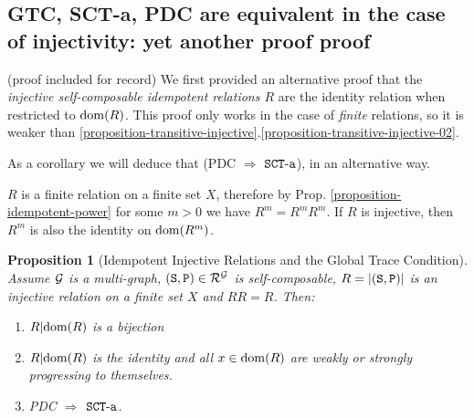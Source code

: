 \documentclass{lmcs}
\newtheorem{proposition}[theorem]{Proposition}
\begin{document}
\subsection{GTC, SCT-a, PDC  are equivalent in the case of injectivity: 
yet another proof proof}
(proof included for record)
\label{subsection-SCT-PDC-old}
We first provided an alternative proof that 
the \emph{injective self-composable idempotent relations $R$} are the identity relation when 
restricted to ${\rm dom}(R)$. This proof only works in the case of \emph{finite} relations,
so it is weaker than 
\ref{proposition-transitive-injective}.\ref{proposition-transitive-injective-02}.

As a corollary we will deduce that (PDC $\Rightarrow$ ${\tt SCT\mbox{-}a}$), in an alternative way.

$R$ is a finite relation on a finite set $X$, therefore by Prop. 
\ref{proposition-idempotent-power} for some $m>0$ we have $R^m=R^mR^m$. 
If $R$ is injective, then $R^m$ is also the identity on ${\rm dom}(R^m)$.


\begin{proposition}[Idempotent Injective Relations
and the Global Trace Condition]
\label{proposition-idempotent-relations}
Assume ${\mathcal G}$ is a multi-graph, $({\tt S},{\tt P}) \in {\mathcal R}^{\mathcal G}$ is self-composable, 
$R = {| ({\tt S},{\tt P}) |}$ is an \emph{injective} relation on a finite set $X$ and $RR=R$. 
Then:
\begin{enumerate}

\item
$R {|} {\rm dom}(R) $ is a bijection

\item
$R {|} {\rm dom}(R) $ is the identity and all
$x \in {\rm dom}(R)$ are weakly or strongly progressing to themselves.

\item
PDC $\Rightarrow$ ${\tt SCT\mbox{-}a}$.
\end{enumerate}
\end{proposition}
\end{document}
